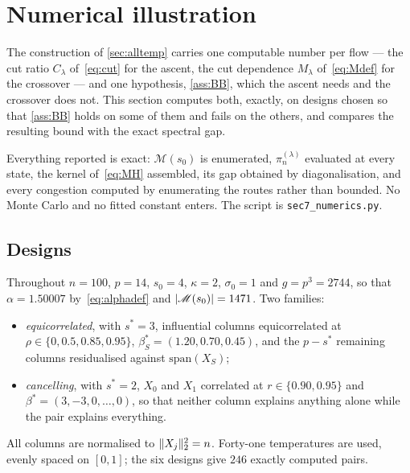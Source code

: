 \documentclass[aos]{imsart}
\DeclarePairedDelimiter{\norm}{\lVert}{\rVert}
\DeclarePairedDelimiter{\abs}{\lvert}{\rvert}
\theoremstyle{plain}
\theoremstyle{definition}
\begin{document}


    \section{Numerical illustration}
    \label{sec:numerics}

    The construction of \cref{sec:alltemp} carries one computable number
    per flow --- the cut ratio $C_\lambda$ of~\eqref{eq:cut} for the ascent,
    the cut dependence $M_\lambda$ of~\eqref{eq:Mdef} for the crossover ---
    and one hypothesis, \cref{ass:BB}, which the ascent needs and the
    crossover does not. This section computes both, exactly, on
    designs chosen so that \cref{ass:BB} holds on some of them and fails on
    the others, and compares the resulting bound with the exact spectral
    gap.

    Everything reported is exact: $\mathscr{M}(s_0)$ is enumerated,
    $\pi_n^{(\lambda)}$ evaluated at every state, the kernel
    of~\eqref{eq:MH} assembled, its gap obtained by diagonalisation, and
    every congestion computed by enumerating the routes rather than bounded.
    No Monte Carlo and no fitted constant enters. The script is
    \texttt{sec7\_numerics.py}.

    \subsection{Designs}
    \label{sub:designs}

    Throughout $n=100$, $p=14$, $s_0=4$, $\kappa=2$, $\sigma_0=1$ and
    $g=p^{3}=2744$, so that $\alpha=1.50007$ by~\eqref{eq:alphadef} and
    $\abs{\mathscr{M}(s_0)}=1471$. Two families:
    \begin{itemize}[noitemsep,leftmargin=2.2em]
        \item \emph{equicorrelated}, with $s^{\ast}=3$, influential columns
        equicorrelated at $\rho\in\{0,0.5,0.85,0.95\}$,
        $\beta^{\ast}_{S}=(1.20,0.70,0.45)$, and the $p-s^{\ast}$ remaining
        columns residualised against $\mathrm{span}(X_S)$;
        \item \emph{cancelling}, with $s^{\ast}=2$, $X_0$ and $X_1$
        correlated at $r\in\{0.90,0.95\}$ and
        $\beta^{\ast}=(3,-3,0,\dots,0)$, so that neither column explains
        anything alone while the pair explains everything.
    \end{itemize}
    All columns are normalised to $\norm{X_j}_2^{2}=n$. Forty-one
    temperatures are used, evenly spaced on $[0,1]$; the six designs give
    $246$ exactly computed pairs.
\end{document}
